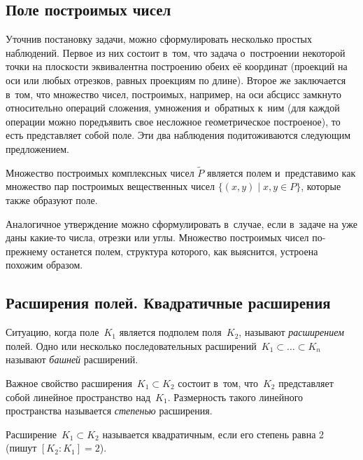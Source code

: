\documentclass{article}
\begin{document}
\subsection{Поле построимых чисел}

Уточнив постановку задачи, можно сформулировать несколько простых наблюдений.
Первое из них состоит в~том, что задача о~построении некоторой точки на
плоскости эквивалентна построению обеих её координат (проекций на оси или любых
отрезков, равных проекциям по длине). Второе же заключается в~том, что множество
чисел, построимых, например, на оси абсцисс замкнуто относительно операций
сложения, умножения и~обратных к~ним (для каждой операции можно поредъявить свое
несложное геометрическое построеное), то есть представляет собой поле. Эти два
наблюдения подитоживаются следующим предложением.

\begin{claim}
  Множество построимых комплексных чисел $\widetilde{P}$ является полем
  и~представимо как множество пар построимых вещественных чисел $\{(x,y) \mid x,
  y \in P\}$, которые также образуют поле.
\end{claim}

\begin{remark}
  Аналогичное утверждение можно сформулировать в~случае, если в~задаче на уже
  даны какие-то числа, отрезки или углы. Множество построимых чисел по-прежнему
  останется полем, структура которого, как выяснится, устроена похожим образом.
\end{remark}

\subsection{Расширения полей. Квадратичные расширения}

\begin{definition}
  Ситуацию, когда поле~$K_1$ является подполем поля~$K_2$, называют
  \emph{расширением}   полей. Одно или несколько последовательных
  расширений~$K_1 \subset \ldots \subset K_n$ называют \emph{башней} расширений.
\end{definition}

\begin{remark}
  Важное свойство расширения~$K_1 \subset K_2$ состоит в~том, что~$K_2$
  представляет собой линейное пространство над~$K_1$. Размерность такого
  линейного пространства называется \emph{степенью} расширения.
\end{remark}

\begin{definition}
  Расширение~$K_1 \subset K_2$ называется квадратичным, если его степень равна
  2 (пишут $[K_2\colon K_1] = 2$).
\end{definition}
\end{document}
